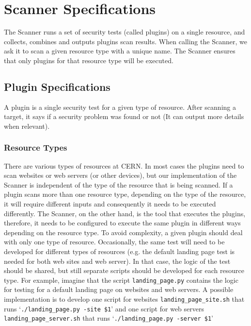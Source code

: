 \section{Scanner Specifications}
The Scanner runs a set of security tests (called plugins) on a single resource, and collects, combines and outputs plugins scan results. When calling the Scanner, we ask it to scan a given resource type with a unique name. The Scanner ensures that only plugins for that resource type will be executed. 

\subsection{Plugin Specifications}
A plugin is a single security test for a given type of resource. After scanning a target, it says if a security problem was found or not (It can output more details when relevant). 
\subsubsection{Resource Types}
There are various types of resources at CERN. In most cases the plugins need to scan websites or web servers (or other devices), but our implementation of the Scanner is independent of the type of the resource that is being scanned. If a plugin scans more than one resource type, depending on the type of the resource, it will require different inputs and consequently it needs to be executed differently. The Scanner, on the other hand, is the tool that executes the plugins, therefore, it needs to be configured to execute the same plugin in different ways depending on the resource type. To avoid complexity, a given plugin should deal with only one type of resource. Occasionally, the same test will need to be developed for different types of resources (e.g. the default landing page test is needed for both web sites and web server). In that case, the logic of the test should be shared, but still separate scripts should be developed for each resource type. For example, imagine that the script \texttt{landing\_page.py} contains the logic for testing for a default landing page on websites and web servers. A possible implementation is to develop one script for websites \texttt{landing\_page\_site.sh} that runs `\texttt{./landing\_page.py -site \$1}' and one script for web servers \texttt{landing\_page\_server.sh} that runs `\texttt{./landing\_page.py -server \$1}' 
